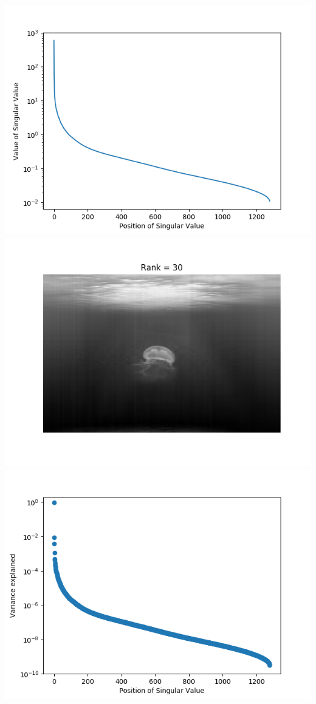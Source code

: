 \documentclass[11pt]{article}
\begin{document}
\begin{enumerate}
\includegraphics[scale=.55]{jelly_sv.png}\\
\includegraphics[scale=.55]{jelly_compress_30.png}
\includegraphics[scale=.55]{jelly_var.png}\\

\end{enumerate}
\end{document}
